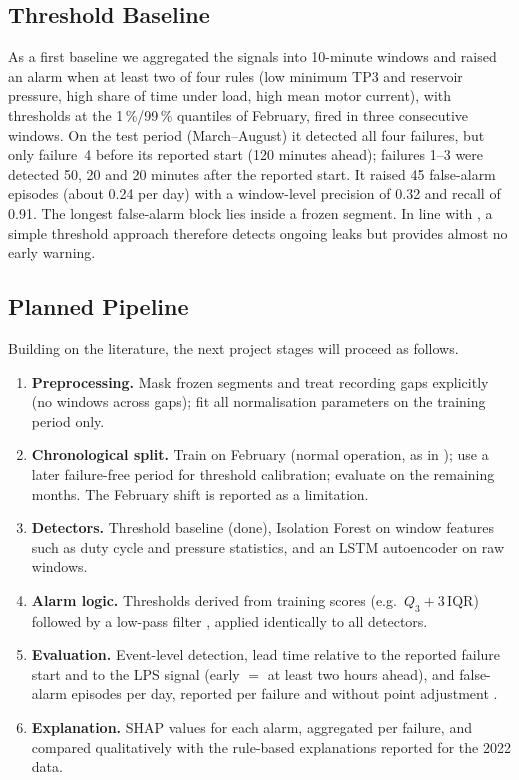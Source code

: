 \subsection{Threshold Baseline}
As a first baseline we aggregated the signals into 10-minute windows and raised an alarm when at least two of four rules (low minimum TP3 and reservoir pressure, high share of time under load, high mean motor current), with thresholds at the 1\,\%/99\,\% quantiles of February, fired in three consecutive windows. On the test period (March--August) it detected all four failures, but only failure~4 before its reported start (120 minutes ahead); failures 1--3 were detected 50, 20 and 20 minutes after the reported start. It raised 45 false-alarm episodes (about 0.24 per day) with a window-level precision of 0.32 and recall of 0.91. The longest false-alarm block lies inside a frozen segment. In line with \citet{veloso2022metropt}, a simple threshold approach therefore detects ongoing leaks but provides almost no early warning.

\subsection{Planned Pipeline}
Building on the literature, the next project stages will proceed as follows.
\begin{enumerate}[itemsep=2pt]
  \item \textbf{Preprocessing.} Mask frozen segments and treat recording gaps explicitly (no windows across gaps); fit all normalisation parameters on the training period only.
  \item \textbf{Chronological split.} Train on February (normal operation, as in \citet{silva2023adversarial}); use a later failure-free period for threshold calibration; evaluate on the remaining months. The February shift is reported as a limitation.
  \item \textbf{Detectors.} Threshold baseline (done), Isolation Forest \citep{liu2008isolation} on window features such as duty cycle and pressure statistics, and an LSTM autoencoder \citep{malhotra2016lstm} on raw windows.
  \item \textbf{Alarm logic.} Thresholds derived from training scores (e.g.\ $Q_3 + 3\,\mathrm{IQR}$) followed by a low-pass filter \citep{ribeiro2016sequential}, applied identically to all detectors.
  \item \textbf{Evaluation.} Event-level detection, lead time relative to the reported failure start and to the LPS signal (early $=$ at least two hours ahead), and false-alarm episodes per day, reported per failure and without point adjustment \citep{kim2022rigorous,lavin2015nab}.
  \item \textbf{Explanation.} SHAP values \citep{lundberg2017shap} for each alarm, aggregated per failure, and compared qualitatively with the rule-based explanations reported for the 2022 data.
\end{enumerate}

